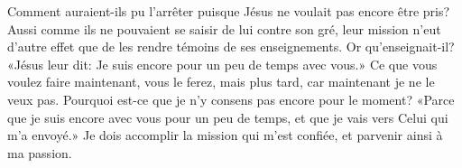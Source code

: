  Comment auraient-ils pu l’arrêter
	puisque Jésus ne voulait pas encore être pris?
Aussi comme ils ne pouvaient se saisir de lui contre son gré,
	leur mission n’eut d’autre effet
		que de les rendre témoins de ses enseignements.
Or qu’enseignait-il?
	«Jésus leur dit: Je suis encore pour un peu de temps avec vous.»
Ce que vous voulez faire maintenant, vous le ferez, mais plus tard,
	car maintenant je ne le veux pas.
Pourquoi est-ce que je n’y consens pas encore pour le moment?
	«Parce que je suis encore avec vous pour un peu de temps,
	et que je vais vers Celui qui m’a envoyé.»
Je dois accomplir la mission qui m’est confiée,
	et parvenir ainsi à ma passion.
